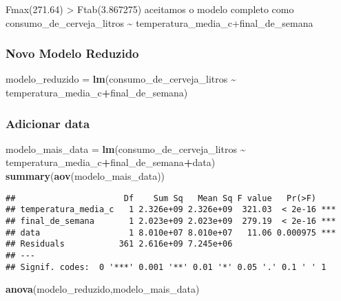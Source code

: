 \documentclass[
]{article}
\newenvironment{Shaded}{\begin{snugshade}}{\end{snugshade}}
\newcommand{\FunctionTok}[1]{\textcolor[rgb]{0.13,0.29,0.53}{\textbf{#1}}}
\newcommand{\NormalTok}[1]{#1}
\newcommand{\OtherTok}[1]{\textcolor[rgb]{0.56,0.35,0.01}{#1}}
\newcommand{\SpecialCharTok}[1]{\textcolor[rgb]{0.81,0.36,0.00}{\textbf{#1}}}
\begin{document}
Fmax(271.64) \textgreater{} Ftab(3.867275) aceitamos o modelo completo
como consumo\_de\_cerveja\_litros \textasciitilde{}
temperatura\_media\_c+final\_de\_semana

\hypertarget{novo-modelo-reduzido}{%
\subsubsection{Novo Modelo Reduzido}\label{novo-modelo-reduzido}}

\begin{Shaded}
\begin{Highlighting}[]
\NormalTok{modelo\_reduzido }\OtherTok{=} \FunctionTok{lm}\NormalTok{(consumo\_de\_cerveja\_litros }\SpecialCharTok{\textasciitilde{}}\NormalTok{ temperatura\_media\_c}\SpecialCharTok{+}\NormalTok{final\_de\_semana)}
\end{Highlighting}
\end{Shaded}

\hypertarget{adicionar-data-1}{%
\subsubsection{Adicionar data}\label{adicionar-data-1}}

\begin{Shaded}
\begin{Highlighting}[]
\NormalTok{modelo\_mais\_data }\OtherTok{=} \FunctionTok{lm}\NormalTok{(consumo\_de\_cerveja\_litros }\SpecialCharTok{\textasciitilde{}}\NormalTok{ temperatura\_media\_c}\SpecialCharTok{+}\NormalTok{final\_de\_semana}\SpecialCharTok{+}\NormalTok{data)}
\FunctionTok{summary}\NormalTok{(}\FunctionTok{aov}\NormalTok{(modelo\_mais\_data))}
\end{Highlighting}
\end{Shaded}

\begin{verbatim}
##                      Df    Sum Sq   Mean Sq F value   Pr(>F)    
## temperatura_media_c   1 2.326e+09 2.326e+09  321.03  < 2e-16 ***
## final_de_semana       1 2.023e+09 2.023e+09  279.19  < 2e-16 ***
## data                  1 8.010e+07 8.010e+07   11.06 0.000975 ***
## Residuals           361 2.616e+09 7.245e+06                     
## ---
## Signif. codes:  0 '***' 0.001 '**' 0.01 '*' 0.05 '.' 0.1 ' ' 1
\end{verbatim}

\begin{Shaded}
\begin{Highlighting}[]
\FunctionTok{anova}\NormalTok{(modelo\_reduzido,modelo\_mais\_data)}
\end{Highlighting}
\end{Shaded}
\end{document}
